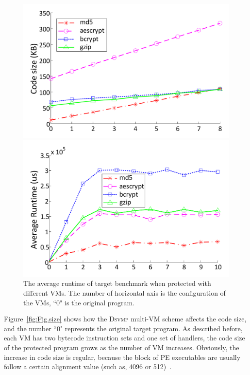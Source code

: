 \documentclass[preprint,12pt,3p]{elsarticle}
\newcommand{\DSVMP}{\textsc{Dsvmp }}
\begin{document}
\begin{figure}[t]
\centering
\begin{minipage}[t]{0.49\linewidth}
\centering
\includegraphics[width=.9\textwidth]{figure/codesize.pdf}
\caption{The impact of code sizes for \DSVMP configurations with a different number of VMs. The number of horizontal axis is the configuration of the VMs, ``0" is the original program.}\label{fig:Fig.size}
\end{minipage}
\hspace{0.005\textwidth}
\begin{minipage}[t]{0.49\linewidth}
\centering
\includegraphics[width=.9\textwidth]{figure/runtime.pdf}
\caption{The average runtime of target benchmark when protected with different VMs. The number of horizontal axis is the configuration of the VMs, ``0" is the original program.}\label{fig:Fig.time}
\end{minipage}
\end{figure}


Figure~\ref{fig:Fig.size} shows how the \DSVMP multi-VM scheme affects the code size,
and the number ``0" represents the original target program.
As described before, each VM has two bytecode instruction sets and one set of handlers,
the code size of the protected program grows as the number of VM increases.
Obviously, the increase in code size is regular, because the block of PE executables
are usually follow a certain alignment value (such as, 4096 or 512)~\cite{pe}.
\end{document}
